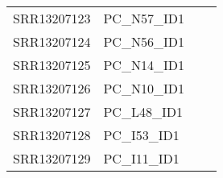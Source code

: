\begin{table}[ht]
\begin{tabular}{llll}
SRR13207123 & PC\_N57\_ID1 \\
SRR13207124 & PC\_N56\_ID1 \\
SRR13207125 & PC\_N14\_ID1 \\
SRR13207126 & PC\_N10\_ID1 \\
SRR13207127 & PC\_L48\_ID1 \\
SRR13207128 & PC\_I53\_ID1 \\
SRR13207129 & PC\_I11\_ID1 \\
\hline 
\end{tabular} 
\end{table}
